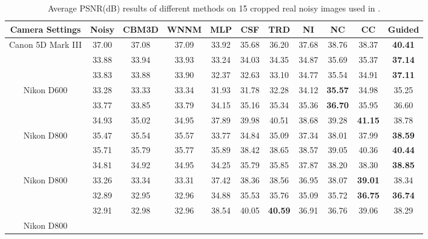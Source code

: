 \documentclass[10pt,twocolumn,letterpaper]{article}
\begin{document}
\begin{table}\label{tab2}
\caption{Average PSNR(dB) results of different methods on 15 cropped real noisy images used in \cite{crosschannel2016}.}
\label{tab1}
\begin{center}
\renewcommand\arraystretch{1}
\begin{tabular}{|c||c|c|c|c|c|c|c|c|c|c|}
\hline
Camera Settings & \textbf{Noisy} &\textbf{CBM3D}&\textbf{WNNM}&\textbf{MLP}&\textbf{CSF}&\textbf{TRD}& \textbf{NI}& \textbf{NC}& \textbf{CC} &\textbf{Guided} 
\\
\hline
\multirow{3}{*}{\small{Canon 5D Mark III}} 
& 37.00 & 37.08 & 37.09 & 33.92 & 35.68 & 36.20 & 37.68 & 38.76 & 38.37 & \textbf{40.41}
\\ 
\cline{2-11} 
\multirow{3}{*}{ISO = 3200}   
& 33.88 & 33.94 & 33.93 & 33.24 & 34.03 & 34.35 & 34.87 & 35.69 & 35.37 & \textbf{37.14}
\\ 
\cline{2-11}    
& 33.83 & 33.88 & 33.90 & 32.37 & 32.63 & 33.10 & 34.77 & 35.54 & 34.91 & \textbf{37.11}  
\\
\hline
\multirow{3}{*}{Nikon D600} 
& 33.28 & 33.33 & 33.34 & 31.93 & 31.78 & 32.28 & 34.12 & \textbf{35.57} & 34.98 & 35.25
\\ 
\cline{2-11} 
\multirow{3}{*}{ISO = 3200}   
& 33.77 & 33.85 & 33.79 & 34.15 & 35.16 & 35.34 & 35.36 & \textbf{36.70} & 35.95 & 36.60
\\ 
\cline{2-11}    
& 34.93 & 35.02 & 34.95 & 37.89 & 39.98 & 40.51 & 38.68 & 39.28 & \textbf{41.15} & 38.78
\\
\hline
\multirow{3}{*}{Nikon D800} 
& 35.47 & 35.54 & 35.57 & 33.77 & 34.84 & 35.09 & 37.34 & 38.01 & 37.99 & \textbf{38.59}
\\ 
\cline{2-11} 
\multirow{3}{*}{ISO = 1600}   
& 35.71 & 35.79 & 35.77 & 35.89 & 38.42 & 38.65 & 38.57 & 39.05 & 40.36 & \textbf{40.44}
\\ 
\cline{2-11}    
& 34.81 & 34.92 & 34.95 & 34.25 & 35.79 & 35.85 & 37.87 & 38.20 & 38.30 & \textbf{38.85}
\\
\hline
\multirow{3}{*}{Nikon D800} 
& 33.26 & 33.34 & 33.31 & 37.42 & 38.36 & 38.56 & 36.95 & 38.07 & \textbf{39.01} & 38.34
\\ 
\cline{2-11} 
\multirow{3}{*}{ISO = 3200}   
& 32.89 & 32.95 & 32.96 & 34.88 & 35.53 & 35.76 & 35.09 & 35.72 & \textbf{36.75} & \textbf{36.74}
\\ 
\cline{2-11}    
& 32.91 & 32.98 & 32.96 & 38.54 & 40.05 & \textbf{40.59} & 36.91 & 36.76 & 39.06 & 38.29
\\
\hline
\multirow{3}{*}{Nikon D800} 

\end{tabular}
\end{center}
\end{table}
\end{document}
